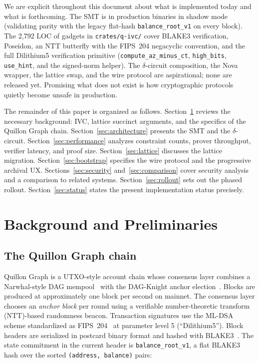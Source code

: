 \documentclass[11pt,a4paper]{article}
\begin{document}
We are explicit throughout this document about what is implemented today and
what is forthcoming. The SMT is in production binaries in shadow mode (validating
parity with the legacy flat-hash \texttt{balance\_root\_v1} on every block).
The 2{,}792 LOC of gadgets in \texttt{crates/q-ivc/} cover BLAKE3 verification,
Poseidon, an NTT butterfly with the FIPS~204 negacyclic convention, and the full
Dilithium5 verification primitive (\texttt{compute\_az\_minus\_ct},
\texttt{high\_bits}, \texttt{use\_hint}, and the signed-norm helper). The
$\delta$-circuit composition, the Nova wrapper, the lattice swap, and the wire
protocol are aspirational; none are released yet. Promising what does not exist
is how cryptographic protocols quietly become unsafe in production.

The remainder of this paper is organized as follows. Section~\ref{sec:background}
reviews the necessary background: IVC, lattice succinct arguments, and the
specifics of the Quillon Graph chain. Section~\ref{sec:architecture} presents the
SMT and the $\delta$-circuit. Section~\ref{sec:performance} analyzes constraint
counts, prover throughput, verifier latency, and proof size.
Section~\ref{sec:lattice} discusses the lattice migration.
Section~\ref{sec:bootstrap} specifies the wire protocol and the progressive
archival UX. Sections~\ref{sec:security} and~\ref{sec:comparison} cover
security analysis and a comparison to related systems.
Section~\ref{sec:rollout} sets out the phased rollout.
Section~\ref{sec:status} states the present implementation status precisely.

\section{Background and Preliminaries}
\label{sec:background}

\subsection{The Quillon Graph chain}

Quillon Graph is a UTXO-style account chain whose consensus layer combines a
Narwhal-style DAG mempool~\cite{NarwhalTusk2022} with the
DAG-Knight anchor election~\cite{KaramanolakisDAGKnight2022}. Blocks are produced
at approximately one block per second on mainnet. The consensus layer chooses
an \emph{anchor block} per round using a verifiable number-theoretic transform
(NTT)-based randomness beacon. Transaction signatures use the ML-DSA scheme
standardized as FIPS~204~\cite{FIPS204} at parameter level 5 (``Dilithium5'').
Block headers are serialized in postcard
binary format and hashed with BLAKE3~\cite{BLAKE3spec}. The state commitment
in the current header is \texttt{balance\_root\_v1}, a flat BLAKE3 hash over the
sorted \texttt{(address, balance)} pairs:
\end{document}
